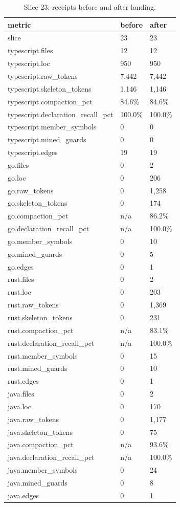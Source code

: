 \documentclass{article}
\begin{document}
\begin{table}[h]
\centering
\begin{tabular}{lll}
\toprule
metric & before & after \\
\midrule
slice & 23 & 23 \\
typescript.files & 12 & 12 \\
typescript.loc & 950 & 950 \\
typescript.raw\_tokens & 7,442 & 7,442 \\
typescript.skeleton\_tokens & 1,146 & 1,146 \\
typescript.compaction\_pct & 84.6\% & 84.6\% \\
typescript.declaration\_recall\_pct & 100.0\% & 100.0\% \\
typescript.member\_symbols & 0 & 0 \\
typescript.mined\_guards & 0 & 0 \\
typescript.edges & 19 & 19 \\
go.files & 0 & 2 \\
go.loc & 0 & 206 \\
go.raw\_tokens & 0 & 1,258 \\
go.skeleton\_tokens & 0 & 174 \\
go.compaction\_pct & n/a & 86.2\% \\
go.declaration\_recall\_pct & n/a & 100.0\% \\
go.member\_symbols & 0 & 10 \\
go.mined\_guards & 0 & 5 \\
go.edges & 0 & 1 \\
rust.files & 0 & 2 \\
rust.loc & 0 & 203 \\
rust.raw\_tokens & 0 & 1,369 \\
rust.skeleton\_tokens & 0 & 231 \\
rust.compaction\_pct & n/a & 83.1\% \\
rust.declaration\_recall\_pct & n/a & 100.0\% \\
rust.member\_symbols & 0 & 15 \\
rust.mined\_guards & 0 & 10 \\
rust.edges & 0 & 1 \\
java.files & 0 & 2 \\
java.loc & 0 & 170 \\
java.raw\_tokens & 0 & 1,177 \\
java.skeleton\_tokens & 0 & 75 \\
java.compaction\_pct & n/a & 93.6\% \\
java.declaration\_recall\_pct & n/a & 100.0\% \\
java.member\_symbols & 0 & 24 \\
java.mined\_guards & 0 & 8 \\
java.edges & 0 & 1 \\
\bottomrule
\end{tabular}
\caption{Slice 23: receipts before and after landing.}
\label{tab:slice23}
\end{table}
\end{document}
